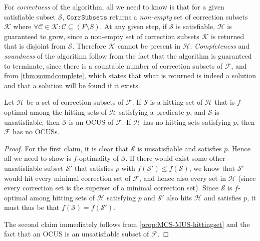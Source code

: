 \documentclass{llncs}
\newcommand\m[1]{\mathcal{#1}}
\newcommand\comment[1]{\marginpar{\tiny #1}}
\renewcommand\comment[1]{#1}
\newcommand{\bart}[1]{{\comment{\color{OliveGreen}Bart: #1}}}
\newcommand\setstohit{\ensuremath{\m{H} }\xspace}
\newcommand\formula{\ensuremath{\m{F} }\xspace}
\newcommand\mm[1]{\ensuremath{#1}\xspace}
\newcommand\call[1]{\mm{\texttt{#1}}}
\newcommand\comus{\mm{\call{OCUS}}}
\newcommand\corrsubsets{\mm{\call{CorrSubsets}}}
\begin{document}
For \emph{correctness} of the algorithm, all we need to know is that for a given satisfiable subset $\m{S}$, \corrsubsets returns a \emph{non-empty} set of correction subsets~$\m{K}$ where $\forall \m{C} \in \m{K} : \m{C} \subseteq (F \setminus S)$. %
At any given step, if $\m{S}$ is satisfiable, $\setstohit$ is guaranteed to grow, since a non-empty set of correction subsets $\m{K}$ is returned that is disjoint from $\m{S}$. Therefore $\m{K}$ cannot be present in $\setstohit$. 
\emph{Completeness} and \emph{soundness} of the algorithm follow from the fact that the algorithm is guaranteed to terminate, since there is a countable number of correction subsets of $\formula$, and from %
\ref{thm:soundcomplete}, which states that what is returned is indeed a solution and that a solution will be found if it exists.  

\begin{theorem}\label{thm:soundcomplete}
	Let $\m{H}$ be a set of correction subsets of \formula. 
	If $\m{S}$ is a hitting set of $\m{H}$ that is $f$-optimal among the hitting sets of $\m{H}$ satisfying a predicate $p$, and  $\m{S}$ is unsatisfiable, then $\m{S}$ is an OCUS of $\formula$. 
	If  $\m{H}$ has no hitting sets satisfying $p$, then $\formula$ has no OCUSs.
\end{theorem}
\begin{proof}
	For the first claim, it is clear that $\m{S}$ is unsatisfiable and satisfies $p$. Hence all we need to show is $f$-optimality of $\m{S}$.
	If there would exist some other unsatisfiable subset $\m{S}'$ that satisfies $p$ with $f(\m{S}')\leq f(\m{S})$, we know that $\m{S}'$ would hit every minimal correction set of $\m{F}$, and hence also every set in $\m{H}$ (since every correction set is the superset of a minimal correction set).
	Since $\m{S}$ is $f$-optimal among hitting sets of $\m{H}$ satisfying $p$ and $\m{S}'$ also hits $\m{H}$ and satisfies $p$, it must thus be that $f(\m{S})=f(\m{S}')$. 
	
	The second claim immediately follows from \ref{prop:MCS-MUS-hittingset} and the fact that an OCUS is an unsatisfiable subset of $\formula$. 
\end{proof}
\end{document}
